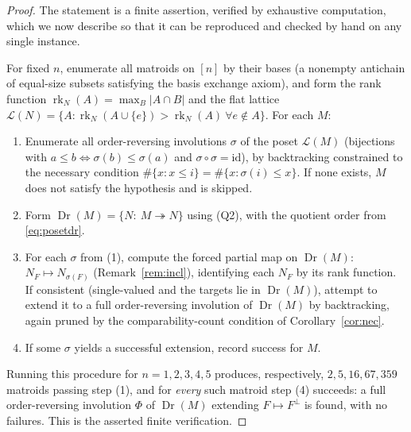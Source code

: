 \documentclass[11pt]{article}
\newcommand{\Dr}{\operatorname{Dr}}
\newcommand{\cL}{\mathcal{L}}
\newcommand{\rk}{\operatorname{rk}}
\theoremstyle{definition}
\theoremstyle{remark}
\begin{document}
\begin{proof}
The statement is a finite assertion, verified by exhaustive computation, which we now
describe so that it can be reproduced and checked by hand on any single instance.

For fixed $n$, enumerate all matroids on $[n]$ by their bases (a nonempty antichain
of equal-size subsets satisfying the basis exchange axiom), and form the rank
function $\rk_N(A)=\max_{B}|A\cap B|$ and the flat lattice $\cL(N)=\{A:\rk_N(A\cup\{e\})>\rk_N(A)\ \forall e\notin A\}$.
For each $M$:
\begin{enumerate}
\item[(1)] Enumerate all order-reversing involutions $\sigma$ of the poset
$\cL(M)$ (bijections with $a\le b\Leftrightarrow\sigma(b)\le\sigma(a)$ and
$\sigma\circ\sigma=\mathrm{id}$), by backtracking constrained to the necessary
condition $\#\{x:x\le i\}=\#\{x:\sigma(i)\le x\}$. If none exists, $M$ does not satisfy
the hypothesis and is skipped.
\item[(2)] Form $\Dr(M)=\{N:\ M\twoheadrightarrow N\}$ using (Q2), with the quotient
order from \eqref{eq:posetdr}.
\item[(3)] For each $\sigma$ from (1), compute the forced partial map on $\Dr(M)$:
$N_F\mapsto N_{\sigma(F)}$ (Remark~\ref{rem:incl}), identifying each $N_F$ by its rank
function. If consistent (single-valued and the targets lie in $\Dr(M)$), attempt to
extend it to a full order-reversing involution of $\Dr(M)$ by backtracking, again
pruned by the comparability-count condition of Corollary~\ref{cor:nec}.
\item[(4)] If some $\sigma$ yields a successful extension, record success for $M$.
\end{enumerate}
Running this procedure for $n=1,2,3,4,5$ produces, respectively, $2,5,16,67,359$
matroids passing step (1), and for \emph{every} such matroid step (4) succeeds: a
full order-reversing involution $\Phi$ of $\Dr(M)$ extending $F\mapsto F^{\perp}$ is
found, with no failures. This is the asserted finite verification.
\end{proof}
\end{document}
